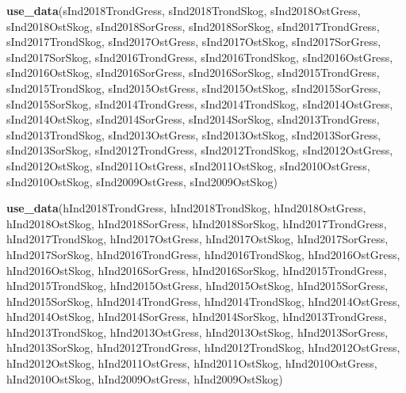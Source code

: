 \documentclass[]{article}
\newenvironment{Shaded}{\begin{snugshade}}{\end{snugshade}}
\newcommand{\KeywordTok}[1]{\textcolor[rgb]{0.13,0.29,0.53}{\textbf{#1}}}
\newcommand{\NormalTok}[1]{#1}
\begin{document}
\begin{Shaded}
\begin{Highlighting}[]
\KeywordTok{use_data}\NormalTok{(sInd2018TrondGress, sInd2018TrondSkog, sInd2018OstGress, sInd2018OstSkog, sInd2018SorGress, sInd2018SorSkog,}
\NormalTok{sInd2017TrondGress, sInd2017TrondSkog, sInd2017OstGress, sInd2017OstSkog, sInd2017SorGress, sInd2017SorSkog,}
\NormalTok{sInd2016TrondGress, sInd2016TrondSkog, sInd2016OstGress, sInd2016OstSkog, sInd2016SorGress, sInd2016SorSkog,}
\NormalTok{sInd2015TrondGress, sInd2015TrondSkog, sInd2015OstGress, sInd2015OstSkog, sInd2015SorGress, sInd2015SorSkog,}
\NormalTok{sInd2014TrondGress, sInd2014TrondSkog, sInd2014OstGress, sInd2014OstSkog, sInd2014SorGress, sInd2014SorSkog,}
\NormalTok{sInd2013TrondGress, sInd2013TrondSkog, sInd2013OstGress, sInd2013OstSkog, sInd2013SorGress, sInd2013SorSkog,}
\NormalTok{sInd2012TrondGress, sInd2012TrondSkog, sInd2012OstGress, sInd2012OstSkog,}
\NormalTok{sInd2011OstGress, sInd2011OstSkog,}
\NormalTok{sInd2010OstGress, sInd2010OstSkog,}
\NormalTok{sInd2009OstGress, sInd2009OstSkog)}

\KeywordTok{use_data}\NormalTok{(hInd2018TrondGress, hInd2018TrondSkog, hInd2018OstGress, hInd2018OstSkog, hInd2018SorGress, hInd2018SorSkog,}
\NormalTok{hInd2017TrondGress, hInd2017TrondSkog, hInd2017OstGress, hInd2017OstSkog, hInd2017SorGress, hInd2017SorSkog,}
\NormalTok{hInd2016TrondGress, hInd2016TrondSkog, hInd2016OstGress, hInd2016OstSkog, hInd2016SorGress, hInd2016SorSkog,}
\NormalTok{hInd2015TrondGress, hInd2015TrondSkog, hInd2015OstGress, hInd2015OstSkog, hInd2015SorGress, hInd2015SorSkog,}
\NormalTok{hInd2014TrondGress, hInd2014TrondSkog, hInd2014OstGress, hInd2014OstSkog, hInd2014SorGress, hInd2014SorSkog,}
\NormalTok{hInd2013TrondGress, hInd2013TrondSkog, hInd2013OstGress, hInd2013OstSkog, hInd2013SorGress, hInd2013SorSkog,}
\NormalTok{hInd2012TrondGress, hInd2012TrondSkog, hInd2012OstGress, hInd2012OstSkog,}
\NormalTok{hInd2011OstGress, hInd2011OstSkog,}
\NormalTok{hInd2010OstGress, hInd2010OstSkog,}
\NormalTok{hInd2009OstGress, hInd2009OstSkog)}
\end{Highlighting}
\end{Shaded}
\end{document}
